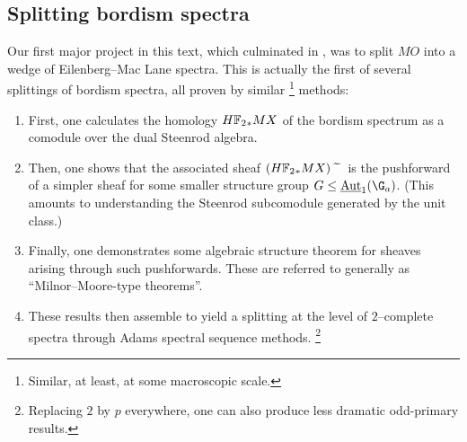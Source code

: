 \subsection*{Splitting bordism spectra}

Our first major project in this text, which culminated in , was to split \(MO\) into a wedge of Eilenberg--Mac Lane spectra.
This is actually the first of several splittings of bordism spectra, all proven by similar%
\footnote{%
Similar, at least, at some macroscopic scale.
}
methods:
\begin{enumerate}
    \item First, one calculates the homology \(\HFtwo_* MX\) of the bordism spectrum as a comodule over the dual Steenrod algebra.
    \item Then, one shows that the associated sheaf \((\HFtwo_* MX)\widetilde{\quad}\) is the pushforward of a simpler sheaf for some smaller structure group \(G \le \InternalAut_1(\G_a)\).
          (This amounts to understanding the Steenrod subcomodule generated by the unit class.)
    \item Finally, one demonstrates some algebraic structure theorem for sheaves arising through such pushforwards.
          These are referred to generally as ``Milnor--Moore-type theorems''.
    \item These results then assemble to yield a splitting at the level of \(2\)--complete spectra through Adams spectral sequence methods.%
\footnote{%
          Replacing \(2\) by \(p\) everywhere, one can also produce less dramatic odd-primary results.
}
\end{enumerate}

